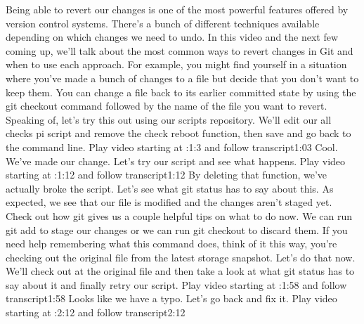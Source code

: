 	Being able to revert our changes is one of the most powerful features offered by version control systems. There's a bunch of different techniques available depending on which changes we need to undo. In this video and the next few coming up, we'll talk about the most common ways to revert changes in Git and when to use each approach. For example, you might find yourself in a situation where you've made a bunch of changes to a file but decide that you don't want to keep them. You can change a file back to its earlier committed state by using the git checkout command followed by the name of the file you want to revert. Speaking of, let's try this out using our scripts repository. We'll edit our all checks pi script and remove the check reboot function, then save and go back to the command line.
	Play video starting at :1:3 and follow transcript1:03
	Cool. We've made our change. Let's try our script and see what happens.
	Play video starting at :1:12 and follow transcript1:12
	By deleting that function, we've actually broke the script. Let's see what git status has to say about this. As expected, we see that our file is modified and the changes aren't staged yet. Check out how git gives us a couple helpful tips on what to do now. We can run git add to stage our changes or we can run git checkout to discard them. If you need help remembering what this command does, think of it this way, you're checking out the original file from the latest storage snapshot. Let's do that now. We'll check out at the original file and then take a look at what git status has to say about it and finally retry our script.
	Play video starting at :1:58 and follow transcript1:58
	Looks like we have a typo. Let's go back and fix it.
	Play video starting at :2:12 and follow transcript2:12
